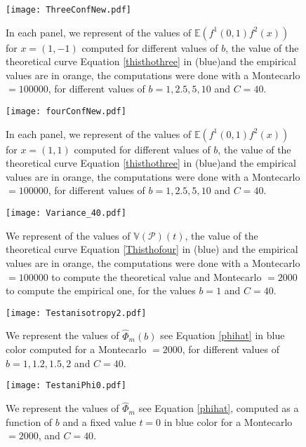 \documentclass[12pt]{article}
\renewcommand{\hat}{\widehat}
\theoremstyle{Theorem}
\begin{document}
\begin{figure}[H]
  \centering
    {\texttt{[image: ThreeConfNew.pdf]}}
    \hspace{0.2cm}
 \caption{In each panel, we represent of the values of $\mathbb{E}\left(f^{1}(0,1)f^{2}(x)\right)$ for $x = (1,-1)$ computed for different values of $b$, the value of the theoretical curve Equation \eqref{thisthothree} in (blue)and the empirical values are in orange, the computations were done with a Montecarlo $= 100000$, for different values of $b = 1, 2.5, 5, 10$ and $C = 40$. }
\label{fig2}
\end{figure}

\begin{figure}[H]
  \centering
    {\texttt{[image: fourConfNew.pdf]}}
    \hspace{0.2cm}
 \caption{In each panel, we represent of the values of $\mathbb{E}\left(f^{1}(0,1)f^{2}(x)\right)$ for $x = (1, 1)$ computed for different values of $b$, the value of the theoretical curve Equation \eqref{thisthothree} in (blue)and the empirical values are in orange, the computations were done with a Montecarlo $= 100000$, for different values of $b = 1, 2.5, 5, 10$ and $C = 40$. }
\label{fig2}
\end{figure}

\begin{figure}[H]
  \centering
    {\texttt{[image: Variance\_40.pdf]}}
    \hspace{0.2cm}
 \caption{We represent of the values of $\mathbb{V}\left(\mathcal{P}\right)(t)$, the value of the theoretical curve Equation \eqref{Thisthofour} in (blue) and the empirical values are in orange, the computations were done with a Montecarlo $= 100000$ to compute the theoretical value and Montecarlo $= 2000$ to compute the empirical one, for the values $b = 1$ and $C = 40$. }
\label{fig2}
\end{figure}

\begin{figure}[H]
  \centering
    {\texttt{[image: Testanisotropy2.pdf]}}
    \hspace{0.2cm} 
 \caption{We represent the values of $\hat{\Phi}_{m}(b)$ see Equation \eqref{phihat} in blue color computed for a Montecarlo $= 2000$, for different values of $b = 1, 1.2, 1.5, 2$ and $C = 40$.}
\label{fig2}
\end{figure}

\begin{figure}[H]
  \centering
    {\texttt{[image: TestaniPhi0.pdf]}}
    \hspace{0.2cm} 
 \caption{We represent the values of $\hat{\Phi}_{m}$ see Equation \eqref{phihat}, computed as a function of $b$ and a fixed value $t=0$ in blue color for a Montecarlo $= 2000$, and $C = 40$.}
\label{fig2}
\end{figure}
\end{document}
